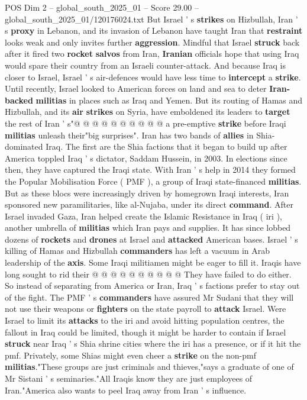 \begin{textsample}{POS Dim 2 – global\_south\_2025\_01 – Score 29.00 – global\_south\_2025\_01/120176024.txt}
But Israel ' s \textbf{strikes} on Hizbullah, Iran ' s \textbf{proxy} in Lebanon, and its invasion of Lebanon have taught Iran that \textbf{restraint} looks weak and only invites further \textbf{aggression}.
Mindful that Israel \textbf{struck} back after it fired two \textbf{rocket} \textbf{salvos} from Iran, \textbf{Iranian} officials hope that using Iraq would spare their country from an Israeli counter-attack.
And because Iraq is closer to Israel, Israel ' s air-defences would have less time to \textbf{intercept} a \textbf{strike}.
Until recently, Israel looked to American forces on land and sea to deter \textbf{Iran-backed} \textbf{militias} in places such as Iraq and Yemen.
But its routing of Hamas and Hizbullah, and its \textbf{air} \textbf{strikes} on Syria, have emboldened its leaders to \textbf{target} the rest of Iran ' s"@ @ @ @ @ @ @ @ @ @ a pre-emptive \textbf{strike} before Iraqi \textbf{militias} unleash their"big surprises".
Iran has two bands of \textbf{allies} in Shia-dominated Iraq.
The first are the Shia factions that it began to build up after America toppled Iraq ' s dictator, Saddam Hussein, in 2003.
In elections since then, they have captured the Iraqi state.
With Iran ' s help in 2014 they formed the Popular Mobilisation Force ( PMF ), a group of Iraqi state-financed \textbf{militias}.
But as these blocs were increasingly driven by homegrown Iraqi interests, Iran sponsored new paramilitaries, like al-Nujaba, under its direct \textbf{command}.
After Israel invaded Gaza, Iran helped create the Islamic Resistance in Iraq ( iri ), another umbrella of \textbf{militias} which Iran pays and supplies.
It has since lobbed dozens of \textbf{rockets} and \textbf{drones} at Israel and \textbf{attacked} American bases.
Israel ' s killing of Hamas and Hizbullah \textbf{commanders} has left a vacuum in Arab leadership of the \textbf{axis}.
Some Iraqi militiamen might be eager to fill it.
Iraqis have long sought to rid their @ @ @ @ @ @ @ @ @ @ They have failed to do either.
So instead of separating from America or Iran, Iraq ' s factions prefer to stay out of the fight.
The PMF ' s \textbf{commanders} have assured Mr Sudani that they will not use their weapons or \textbf{fighters} on the state payroll to \textbf{attack} Israel.
Were Israel to limit its \textbf{attacks} to the iri and avoid hitting population centres, the fallout in Iraq could be limited, though it might be harder to contain if Israel \textbf{struck} near Iraq ' s Shia shrine cities where the iri has a presence, or if it hit the pmf.
Privately, some Shias might even cheer a \textbf{strike} on the non-pmf \textbf{militias}."These groups are just criminals and thieves,"says a graduate of one of Mr Sistani ' s seminaries."All Iraqis know they are just employees of Iran."America also wants to peel Iraq away from Iran ' s influence.

\end{textsample}

